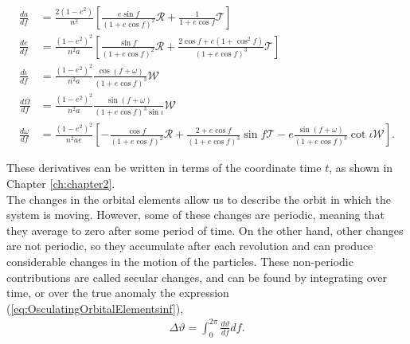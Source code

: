 \begin{subequations}\label{eq:OsculatingOrbitalElementsinf}
\begin{align}
\frac{da}{df} &= \frac{2(1-e^2)}{n^2} \left[ \frac{e \sin f }{(1+e \cos f)^2}\mathcal{R} + \frac{1}{1+e\cos f} \mathcal{T} \right] \\
\frac{de}{df} &= \frac{(1-e^2)^2}{n^2a} \left[ \frac{\sin f}{(1+e \cos f)^2} \mathcal{R} + \frac{2\cos f + e \left( 1 + \cos^2 f \right) }{(1 + e\cos f)^3} \mathcal{T} \right] \\
\frac{d \iota}{df} &= \frac{(1-e^2)^2}{n^2 a} \frac{\cos (f+\omega)}{(1+e\cos f)^3} \mathcal{W} \\
\frac{d \Omega}{df} &= \frac{(1-e^2)^2}{n^2 a}  \frac{\sin (f+\omega)}{(1+e\cos f)^3 \sin \iota } \mathcal{W} \\
\frac{d\omega}{df} &=\frac{(1-e^2)^2}{n^2 a e}  \left[ - \frac{\cos f}{(1+e\cos f)^2} \mathcal{R} + \frac{2+e\cos f}{(1 + e \cos f)^3} \sin f \mathcal{T} - e  \frac{\sin (f + \omega)}{(1 + e \cos f)^3} \cot \iota \mathcal{W} \right].
\end{align}
\end{subequations}

These derivatives can be written in terms of the coordinate time $t$, as shown in Chapter \ref{ch:chapter2}.\\

The changes in the orbital elements allow us to describe the orbit in which the system is moving. However, some of these changes are periodic, meaning that they average to zero after some period of time. On the other hand, other changes are not periodic, so they accumulate after each revolution and can produce considerable changes in the motion of the particles. These non-periodic contributions are called secular changes, and can be found by integrating over time, or over the true anomaly the expression (\ref{eq:OsculatingOrbitalElementsinf}),
\begin{align}\label{eq: secularchanges}
\Delta \vartheta = \int_0^{2\pi} \frac{d \vartheta}{df}df.
\end{align}







